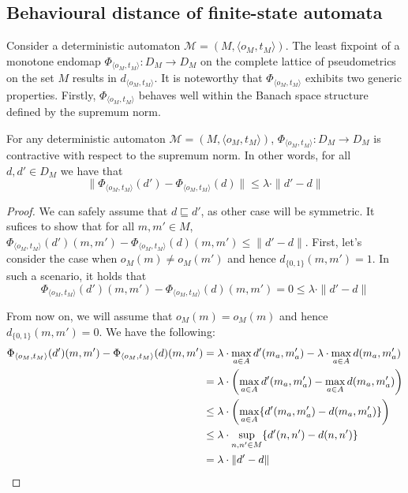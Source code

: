 \subsection{Behavioural distance of finite-state automata}\label{c2:subsec:distance_finite_automata}
Consider a deterministic automaton $\mathcal{M} = (M, \langle o_M, t_M\rangle)$. The least fixpoint of a monotone endomap $\Phi_{\langle o_M, t_M\rangle} \colon D_{M} \to D_{M}$ on the complete lattice of pseudometrics on the set $M$ results in $d_{\langle o_M, t_M\rangle}$.
It is noteworthy that $\Phi_{\langle o_M, t_M\rangle}$ exhibits two generic properties. Firstly, $\Phi_{\langle o_M, t_M\rangle}$ behaves well within the Banach space structure defined by the supremum norm.
\begin{lemma}\label{c2:lem:operator_nonexpansive}
	For any deterministic automaton $\mathcal{M} = (M, \langle o_M, t_M\rangle)$,  $\Phi_{\langle o_M, t_M\rangle} \colon D_M \to D_M$ is contractive with respect to the supremum norm. In other words, for all $d, d' \in D_M$ we have that
    $$\|\Phi_{\langle o_M, t_M\rangle}(d') - \Phi_{\langle o_M, t_M\rangle}(d) \| \leq \lambda \cdot\|d' - d \|$$
\end{lemma}
\begin{proof}
    We can safely assume that $d \sqsubseteq d'$, as other case will be symmetric. It sufices to show that for all $m, m' \in M$, $\Phi_{\langle o_M, t_M\rangle}(d')(m,m') - \Phi_{\langle o_M, t_M\rangle}(d)(m,m') \leq \|d' - d \|$. First, let's consider the case when $o_M(m) \neq o_M(m')$ and hence $d_{\{0,1\}}(m,m')=1$. In such a scenario, it holds that $$\Phi_{\langle o_M, t_M\rangle}(d')(m,m') - \Phi_{\langle o_M, t_M\rangle}(d)(m,m') = 0 \leq \lambda \cdot \|d'-d \|$$ 
    
    From now on, we will assume that $o_M(m) = o_M(m)$ and hence $d_{\{0,1\}}(m,m')=0$. We have the following:
    \begin{align*}
        \Phi_{\langle o_M, t_M\rangle}(d')(m,m') - \Phi_{\langle o_M, t_M\rangle}(d)(m,m') &= \lambda \cdot \max_{a \in {A}} d'(m_a, m'_a) - \lambda \cdot \max_{a \in {A}} d(m_a, m'_a) \\
        &= \lambda \cdot \left( \max_{a \in {A}} d'(m_a, m'_a) - \max_{a \in {A}} d(m_a,  m'_a) \right) \\
        &\leq \lambda \cdot \left(\max_{a \in {A}} \{d'(m_a, m'_a) - d(m_a, m'_a) \}\right) \\  
        &\leq \lambda \cdot \sup_{n,n' \in M} \{ d'(n,n') - d(n,n')\} \\
        &= \lambda \cdot \|d' - d \|
    \end{align*}
\end{proof}
